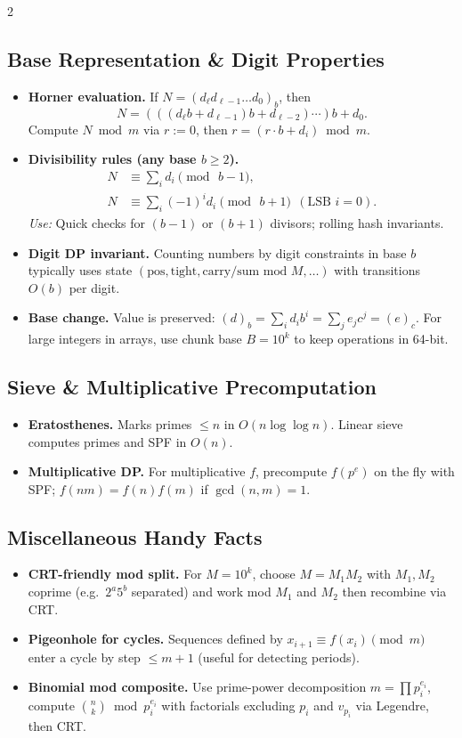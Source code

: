 \documentclass[8pt]{extarticle}
\theoremstyle{definition}
\begin{document}
\begin{multicols*}{2}
\subsection{Base Representation \& Digit Properties}
\begin{itemize}
  \item \textbf{Horner evaluation.} If $N=(d_\ell d_{\ell-1}\dots d_0)_b$, then
  \[
    N = (((d_\ell b + d_{\ell-1})b + d_{\ell-2})\cdots)b + d_0.
  \]
  Compute $N\bmod m$ via $r:=0$, then $r=(r\cdot b+d_i)\bmod m$.
  \item \textbf{Divisibility rules (any base $b\ge 2$).}
  \[
    \begin{aligned}
    N &\equiv \sum_i d_i \pmod{\,b-1},\\
    N &\equiv \sum_i (-1)^i d_i \pmod{\,b+1}\ \ (\text{LSB }i=0).
    \end{aligned}
  \]
  \emph{Use:} Quick checks for $(b-1)$ or $(b+1)$ divisors; rolling hash invariants.
  \item \textbf{Digit DP invariant.} Counting numbers by digit constraints in base $b$ typically uses state $(\text{pos},\text{tight},\text{carry/sum mod }M,\dots)$ with transitions $O(b)$ per digit.
  \item \textbf{Base change.} Value is preserved: $(d)_b=\sum_i d_i b^i=\sum_j e_j c^j = (e)_c$. For large integers in arrays, use chunk base $B=10^k$ to keep operations in 64-bit.
\end{itemize}

\subsection{Sieve \& Multiplicative Precomputation}
\begin{itemize}
  \item \textbf{Eratosthenes.} Marks primes $\le n$ in $O(n\log\log n)$. Linear sieve computes primes and SPF in $O(n)$.
  \item \textbf{Multiplicative DP.} For multiplicative $f$, precompute $f(p^e)$ on the fly with SPF; $f(nm)=f(n)f(m)$ if $\gcd(n,m)=1$.
\end{itemize}

\subsection{Miscellaneous Handy Facts}
\begin{itemize}
  \item \textbf{CRT-friendly mod split.} For $M=10^k$, choose $M=M_1M_2$ with $M_1,M_2$ coprime (e.g.\ $2^a5^b$ separated) and work mod $M_1$ and $M_2$ then recombine via CRT.
  \item \textbf{Pigeonhole for cycles.} Sequences defined by $x_{i+1}\equiv f(x_i)\pmod m$ enter a cycle by step $\le m+1$ (useful for detecting periods).
  \item \textbf{Binomial mod composite.} Use prime-power decomposition $m=\prod p_i^{e_i}$, compute $\binom{n}{k}\bmod p_i^{e_i}$ with factorials excluding $p_i$ and $v_{p_i}$ via Legendre, then CRT.
\end{itemize}



\end{multicols*}
\end{document}
